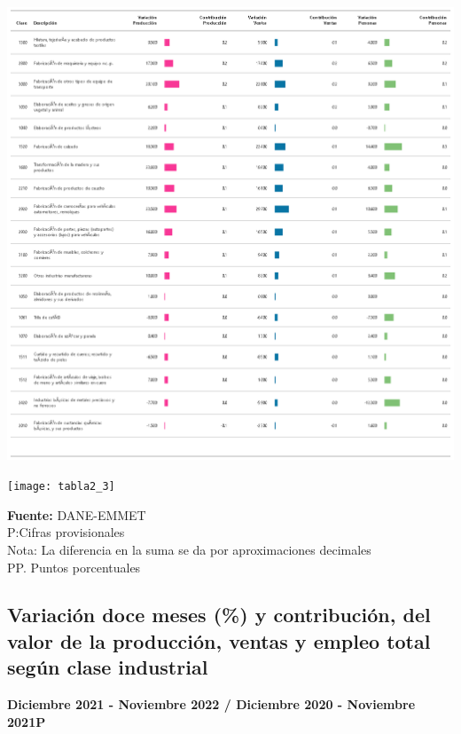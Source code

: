 \documentclass[
]{article}
\begin{document}
\begin{center}\includegraphics[width=14.78in]{tabla2_2} \end{center}

\begin{center}\texttt{[image: tabla2\_3]} \end{center}

\textbf{Fuente:} DANE-EMMET\\
P:Cifras provisionales\\
Nota: La diferencia en la suma se da por aproximaciones decimales\\
PP. Puntos porcentuales\\

\newpage

\hypertarget{variaciuxf3n-doce-meses-y-contribuciuxf3n-del-valor-de-la-producciuxf3n-ventas-y-empleo-total-seguxfan-clase-industrial}{%
\subsection{Variación doce meses (\%) y contribución, del valor de la
producción, ventas y empleo total según clase
industrial}\label{variaciuxf3n-doce-meses-y-contribuciuxf3n-del-valor-de-la-producciuxf3n-ventas-y-empleo-total-seguxfan-clase-industrial}}

\textbf{Diciembre 2021 - Noviembre 2022 / Diciembre 2020 - Noviembre 2021P}\\
\end{document}
